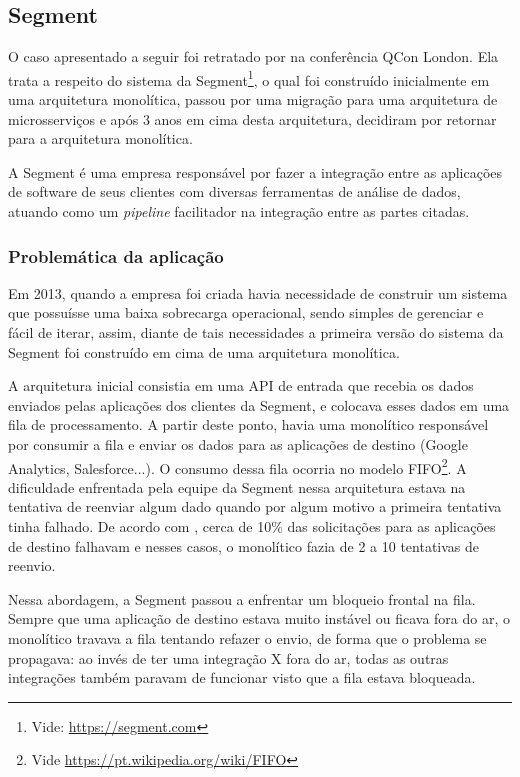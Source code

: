 \subsection{Segment}

O caso apresentado a seguir foi retratado por  na
conferência QCon London. Ela trata a respeito do sistema da Segment\footnote{Vide:
\url{https://segment.com}}, o qual foi construído inicialmente em uma arquitetura monolítica,
passou por uma migração para uma arquitetura de microsserviços e após 3 anos em cima desta
arquitetura, decidiram por retornar para a arquitetura monolítica.

A Segment é uma empresa responsável por fazer a integração entre as aplicações de software de seus
clientes com diversas ferramentas de análise de dados, atuando como um \textit{pipeline} facilitador
na integração entre as partes citadas. 

\subsubsection{Problemática da aplicação}

Em 2013, quando a empresa foi criada havia necessidade de construir um sistema que possuísse uma
baixa sobrecarga operacional, sendo simples de gerenciar e fácil de iterar, assim, diante de tais
necessidades a primeira versão do sistema da Segment foi construído em cima de uma arquitetura monolítica.

A arquitetura inicial consistia em uma \gls{API} de entrada que recebia os dados enviados pelas aplicações dos
clientes da Segment, e colocava esses dados em uma fila de processamento. A partir deste ponto,
havia uma monolítico responsável por consumir a fila e enviar os dados para as aplicações de destino
(Google Analytics, Salesforce...). O consumo dessa fila ocorria no modelo \gls{FIFO}\footnote{Vide
\url{https://pt.wikipedia.org/wiki/FIFO}}. A dificuldade enfrentada pela equipe da Segment nessa
arquitetura estava na tentativa de reenviar algum dado quando por algum motivo a primeira tentativa
tinha falhado. De acordo com , cerca de 10\% das
solicitações para as aplicações de destino falhavam e nesses casos, o monolítico fazia de 2 a 10
tentativas de reenvio.

Nessa abordagem, a Segment passou a enfrentar um bloqueio frontal na fila. Sempre que uma aplicação
de destino estava muito instável ou ficava fora do ar, o monolítico travava a fila tentando refazer
o envio, de forma que o problema se propagava: ao invés de ter uma integração X fora do ar, todas as
outras integrações também paravam de funcionar visto que a fila estava bloqueada.


